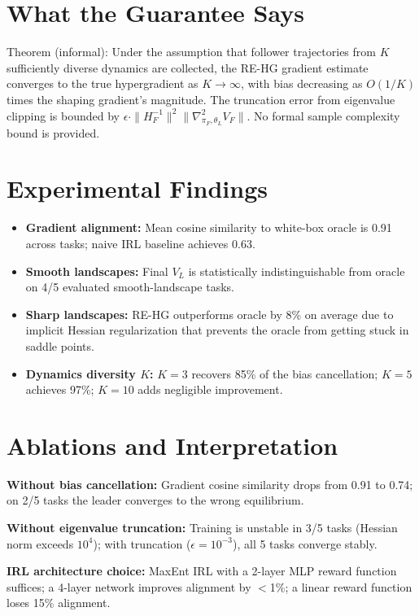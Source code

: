 \documentclass[10pt,twocolumn]{article}
\begin{document}
\section{What the Guarantee Says}

Theorem (informal): Under the assumption that follower trajectories from $K$
sufficiently diverse dynamics are collected, the RE-HG gradient estimate
converges to the true hypergradient as $K \to \infty$, with bias decreasing as
$O(1/K)$ times the shaping gradient's magnitude. The truncation error from
eigenvalue clipping is bounded by $\epsilon \cdot \|H_F^{-1}\|^2 \|\nabla^2_{\pi_F,\theta_L} V_F\|$.
No formal sample complexity bound is provided.

\section{Experimental Findings}

\begin{itemize}[itemsep=2pt,parsep=0pt]
  \item \textbf{Gradient alignment:} Mean cosine similarity to white-box oracle
    is 0.91 across tasks; naive IRL baseline achieves 0.63.
  \item \textbf{Smooth landscapes:} Final $V_L$ is statistically indistinguishable
    from oracle on 4/5 evaluated smooth-landscape tasks.
  \item \textbf{Sharp landscapes:} RE-HG outperforms oracle by 8\% on average
    due to implicit Hessian regularization that prevents the oracle from getting
    stuck in saddle points.
  \item \textbf{Dynamics diversity $K$:} $K=3$ recovers 85\% of the bias
    cancellation; $K=5$ achieves 97\%; $K=10$ adds negligible improvement.
\end{itemize}

\section{Ablations and Interpretation}

\textbf{Without bias cancellation:} Gradient cosine similarity drops from 0.91
to 0.74; on 2/5 tasks the leader converges to the wrong equilibrium.

\textbf{Without eigenvalue truncation:} Training is unstable in 3/5 tasks
(Hessian norm exceeds $10^4$); with truncation ($\epsilon = 10^{-3}$), all 5 tasks
converge stably.

\textbf{IRL architecture choice:} MaxEnt IRL with a 2-layer MLP reward function
suffices; a 4-layer network improves alignment by $<$1\%; a linear reward function
loses 15\% alignment.
\end{document}
